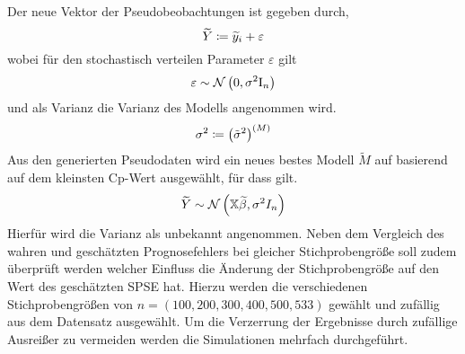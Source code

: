         Der neue Vektor der Pseudobeobachtungen ist gegeben durch,
        \[
            \widetilde{Y} \coloneqq \widetilde{y}_i + \varepsilon
        \]
        wobei für den stochastisch verteilen Parameter $\varepsilon$ gilt
        \[
            \varepsilon \sim \mathcal{N} \left( 0,\sigma^2\mathrm{I}_n \right)
        \]
        und als Varianz die Varianz des Modells angenommen wird.
        \[
            \sigma^2 \coloneqq \left( \tilde{\sigma}^2 \right)^{(M)}
        \]
        Aus den generierten Pseudodaten wird ein neues bestes Modell $\widetilde{M}$ auf basierend auf dem kleinsten Cp-Wert ausgewählt, für dass gilt.
        \[
            \widetilde{Y} \sim \mathcal{N} \left( \mathbb{X}\widetilde{\beta}, \sigma^2 I_n \right)
        \]
        Hierfür wird die Varianz als unbekannt angenommen.
        Neben dem Vergleich des wahren und geschätzten Prognosefehlers bei gleicher Stichprobengröße soll zudem überprüft werden welcher Einfluss die Änderung der Stichprobengröße auf den Wert des geschätzten SPSE hat.
        Hierzu werden die verschiedenen Stichprobengrößen von $n = (100, 200, 300, 400, 500, 533)$ gewählt und zufällig aus dem Datensatz ausgewählt.
        Um die Verzerrung der Ergebnisse durch zufällige Ausreißer zu vermeiden werden die Simulationen mehrfach durchgeführt.



